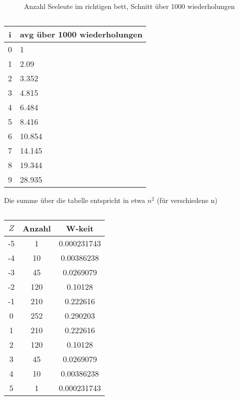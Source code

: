 \documentclass{article}
\begin{document}
	\maketitle
	\section{}
	\subsection{}
	\begin{figure}[h!]
  		\caption{Anzahl Seeleute im richtigen bett, Schnitt über 1000 wiederholungen}
    \end{figure}
    \subsection{}
    \begin{tabular}{c|l}
        \textbf{i}&\textbf{avg über 1000 wiederholungen}\\
        \hline
        0&1\\
        1&2.09\\
        2&3.352\\
        3&4.815\\
        4&6.484\\
        5&8.416\\
        6&10.854\\
        7&14.145\\
        8&19.344\\
        9&28.935
    \end{tabular}
    Die summe über die tabelle entspricht in etwa $n^2$ (für verschiedene n)
    \subsection{}
    \begin{tabular}{c|c|c}
        \textbf{$Z$}&\textbf{Anzahl}&\textbf{W-keit}\\
        \hline
        -5&1&0.000231743\\
        -4&10&0.00386238\\
        -3&45&0.0269079\\
        -2&120&0.10128\\
        -1&210&0.222616\\
        0&252&0.290203\\
        1&210&0.222616\\
        2&120&0.10128\\
        3&45&0.0269079\\
        4&10&0.00386238\\
        5&1&0.000231743
    \end{tabular}
\end{document}
